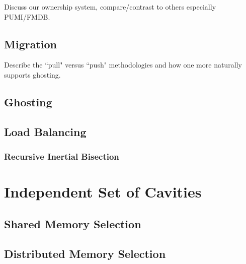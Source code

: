 Discuss our ownership system, compare/contrast to
others especially PUMI/FMDB.

\subsection{Migration}

Describe the ``pull" versus ``push" methodologies and
how one more naturally supports ghosting.

\subsection{Ghosting}

\subsection{Load Balancing}

\subsubsection{Recursive Inertial Bisection}

\section{Independent Set of Cavities}

\subsection{Shared Memory Selection}

\subsection{Distributed Memory Selection}


